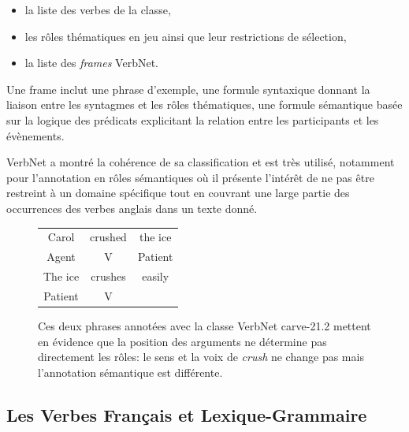 \begin{itemize}
        \item la liste des verbes de la classe,
        \item les rôles thématiques en jeu ainsi que leur restrictions de sélection,
        \item la liste des \emph{frames} VerbNet.
\end{itemize}

Une frame inclut une phrase d'exemple, une formule syntaxique donnant la
liaison entre les syntagmes et les rôles thématiques, une formule sémantique
basée sur la logique des prédicats explicitant la relation entre les
participants et les évènements.



 VerbNet a montré la cohérence de sa classification et est très
utilisé, notamment pour l'annotation en rôles sémantiques
\citep{swier2005exploiting,palmer2013semantic} où il présente l'intérêt de ne
pas être restreint à un domaine spécifique tout en couvrant une large partie
des occurrences des verbes anglais dans un texte donné.

\begin{figure}[ht]
    \centering
    \begin{tabular}{ccc}
        \toprule
        Carol & crushed   & the ice \\
        Agent & V         & Patient \\
        \midrule
        The ice & crushes & easily  \\
        Patient & V       &         \\
        \bottomrule
    \end{tabular}

    \caption{\label{fig:example_srl}Ces deux phrases annotées avec la classe
    VerbNet carve-21.2 mettent en évidence que la position des arguments ne
détermine pas directement les rôles: le sens et la voix de \textit{crush} ne
change pas mais l'annotation sémantique est différente.}

\end{figure}


\subsection{Les Verbes Français et Lexique-Grammaire}


